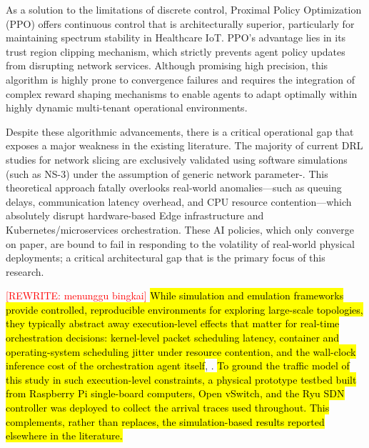 \documentclass[conference]{IEEEtran}
\newcommand{\rev}[1]{\hl{#1}}
\begin{document}
As a solution to the limitations of discrete control, Proximal Policy Optimization (PPO) offers continuous control that is architecturally superior, particularly for maintaining spectrum stability in Healthcare IoT\cite{b17}. PPO's advantage lies in its trust region clipping mechanism, which strictly prevents agent policy updates from disrupting network services. Although promising high precision, this algorithm is highly prone to convergence failures and requires the integration of complex reward shaping mechanisms to enable agents to adapt optimally within highly dynamic multi-tenant operational environments\cite{b18}.

Despite these algorithmic advancements, there is a critical operational gap that exposes a major weakness in the existing literature. The majority of current DRL studies for network slicing are exclusively validated using software simulations (such as NS-3) under the assumption of generic network parameter\cite{b15}-\cite{b20}. This theoretical approach fatally overlooks real-world anomalies---such as queuing delays, communication latency overhead, and CPU resource contention---which absolutely disrupt hardware-based Edge infrastructure and Kubernetes/microservices orchestration. These AI policies, which only converge on paper, are bound to fail in responding to the volatility of real-world physical deployments; a critical architectural gap that is the primary focus of this research.

\textcolor{red}{[REWRITE: menunggu bingkai]} \rev{While simulation and emulation frameworks provide controlled, reproducible environments for exploring large-scale topologies, they typically abstract away execution-level effects that matter for real-time orchestration decisions: kernel-level packet scheduling latency, container and operating-system scheduling jitter under resource contention, and the wall-clock inference cost of the orchestration agent itself}\cite{b47}, \cite{b3}. \rev{To ground the traffic model of this study in such execution-level constraints, a physical prototype testbed built from Raspberry Pi single-board computers, Open vSwitch, and the Ryu SDN controller was deployed to collect the arrival traces used throughout. This complements, rather than replaces, the simulation-based results reported elsewhere in the literature.}
\end{document}

